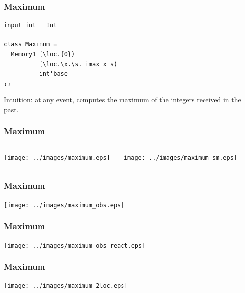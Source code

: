 \documentclass[12pt,red]{beamer}
\begin{document}
\begin{frame}[fragile]
  \frametitle{Maximum}

\begin{emlcode}
\begin{lstlisting}
input int : Int

class Maximum =
  Memory1 (\loc.{0})
          (\loc.\x.\s. imax x s)
          int'base
;;
\end{lstlisting}
\end{emlcode}

Intuition: at any event, computes the maximum of the integers received
in the past.

\end{frame}


\begin{frame}[fragile]
  \frametitle{Maximum}

  \begin{columns}
    \begin{center}
      \texttt{[image: ../images/maximum.eps]}
    \end{center}
    \begin{center}
      \vspace*{1in}
      \texttt{[image: ../images/maximum\_sm.eps]}
    \end{center}
  \end{columns}

\end{frame}


\begin{frame}[fragile]
  \frametitle{Maximum}

  \begin{center}
    \texttt{[image: ../images/maximum\_obs.eps]}
  \end{center}
\end{frame}


\begin{frame}[fragile]
  \frametitle{Maximum}

  \begin{center}
    \texttt{[image: ../images/maximum\_obs\_react.eps]}
  \end{center}
\end{frame}


\begin{frame}[fragile]
  \frametitle{Maximum}

  \begin{center}
    \texttt{[image: ../images/maximum\_2loc.eps]}
  \end{center}
\end{frame}
\end{document}
